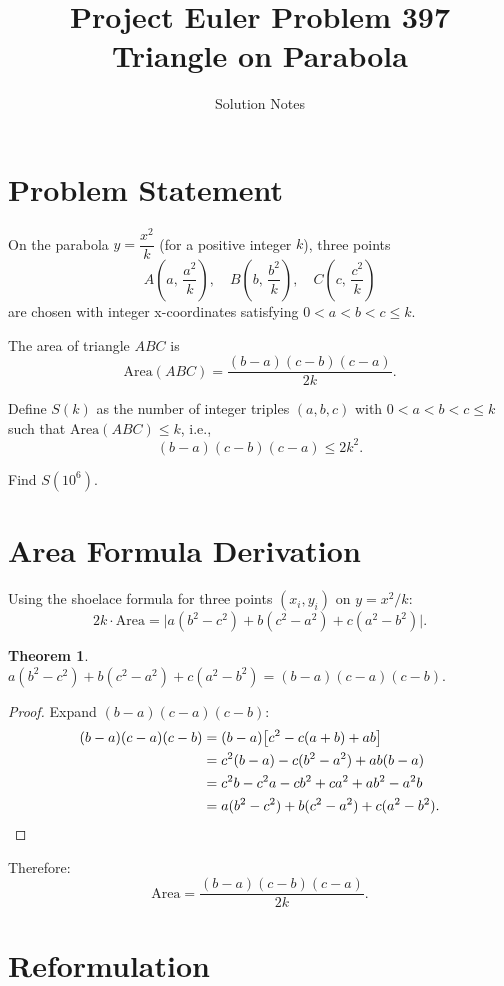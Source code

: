 \documentclass[11pt,a4paper]{article}
\title{Project Euler Problem 397\\[4pt]\large Triangle on Parabola}
\author{Solution Notes}
\date{}
\newtheorem{theorem}{Theorem}
\begin{document}
\maketitle

\section{Problem Statement}

On the parabola $y = \dfrac{x^2}{k}$ (for a positive integer $k$), three points
\[
A\!\left(a,\,\frac{a^2}{k}\right),\quad
B\!\left(b,\,\frac{b^2}{k}\right),\quad
C\!\left(c,\,\frac{c^2}{k}\right)
\]
are chosen with integer x-coordinates satisfying $0 < a < b < c \le k$.

The area of triangle $ABC$ is
\[
\text{Area}(ABC) = \frac{(b-a)(c-b)(c-a)}{2k}.
\]

Define $S(k)$ as the number of integer triples $(a, b, c)$ with $0 < a < b < c \le k$ such that $\text{Area}(ABC) \le k$, i.e.,
\[
(b - a)(c - b)(c - a) \le 2k^2.
\]

Find $S(10^6)$.

\section{Area Formula Derivation}

Using the shoelace formula for three points $(x_i, y_i)$ on $y = x^2/k$:
\[
2k \cdot \text{Area}
= \bigl|a(b^2-c^2) + b(c^2-a^2) + c(a^2-b^2)\bigr|.
\]

\begin{theorem}
$a(b^2-c^2)+b(c^2-a^2)+c(a^2-b^2) = (b-a)(c-a)(c-b).$
\end{theorem}

\begin{proof}
Expand $(b-a)(c-a)(c-b)$:
\begin{align*}
(b-a)(c-a)(c-b) &= (b-a)\bigl[c^2 - c(a+b) + ab\bigr] \\
&= c^2(b-a) - c(b^2-a^2) + ab(b-a) \\
&= c^2 b - c^2 a - cb^2 + ca^2 + ab^2 - a^2 b \\
&= a(b^2-c^2) + b(c^2-a^2) + c(a^2-b^2). \qedhere
\end{align*}
\end{proof}

Therefore:
\[
\boxed{\text{Area} = \frac{(b-a)(c-b)(c-a)}{2k}}.
\]

\section{Reformulation}
\end{document}
